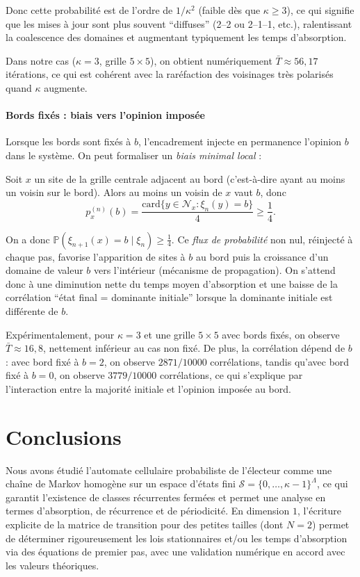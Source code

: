 \documentclass[11pt,a4paper]{article}
\begin{document}
Donc cette probabilité est de l’ordre de $1/\kappa^2$ (faible dès que $\kappa\ge 3$),
ce qui signifie que les mises à jour sont plus souvent ``diffuses'' (2--2 ou 2--1--1, etc.),
ralentissant la coalescence des domaines et augmentant typiquement les temps d’absorption.

Dans notre cas ($\kappa=3$, grille $5\times5$), on obtient numériquement
$\bar{T}\approx 56{,}17$ itérations, ce qui est cohérent avec la raréfaction des voisinages
très polarisés quand $\kappa$ augmente.

\paragraph{Bords fixés : biais vers l'opinion imposée}

Lorsque les bords sont fixés à $b$, l’encadrement injecte en permanence l’opinion $b$ dans le système.
On peut formaliser un \emph{biais minimal local} :

Soit $x$ un site de la grille centrale adjacent au bord (c’est-à-dire ayant au moins un voisin sur le bord).
Alors au moins un voisin de $x$ vaut $b$, donc
\[
p_x^{(n)}(b)=\frac{\text{card}\{y\in\mathcal{N}_x:\xi_n(y)=b\}}{4}\ge \frac{1}{4}.
\]

On a donc $\mathbb{P}(\xi_{n+1}(x)=b\mid \xi_n)\ge \frac{1}{4}$.  Ce
\emph{flux de probabilité} non nul, réinjecté à chaque pas, favorise
l’apparition de sites à $b$ au bord puis la croissance d’un domaine de
valeur $b$ vers l’intérieur (mécanisme de propagation).  On s’attend
donc à une diminution nette du temps moyen d’absorption et une baisse
de la corrélation ``état final = dominante initiale'' lorsque la dominante
initiale est différente de $b$.

Expérimentalement, pour $\kappa=3$ et une grille $5\times5$ avec bords fixés,
on observe $\bar{T}\approx 16{,}8$, nettement inférieur au cas non fixé.
De plus, la corrélation dépend de $b$ :
avec bord fixé à $b=2$, on observe $2871/10000$ corrélations,
tandis qu'avec bord fixé à $b=0$, on observe $3779/10000$ corrélations,
ce qui s’explique par l’interaction entre la majorité initiale et l’opinion imposée au bord.




\section{Conclusions}\label{conclusions}

Nous avons étudié l’automate cellulaire probabiliste de l’électeur
comme une chaîne de Markov homogène sur un espace d’états fini
$\mathcal S=\{0,\dots,\kappa-1\}^{\Lambda}$, ce qui garantit
l’existence de classes récurrentes fermées et permet une analyse en
termes d’absorption, de récurrence et de périodicité. En dimension
$1$, l’écriture explicite de la matrice de transition pour des petites
tailles (dont $N=2$) permet de déterminer rigoureusement les lois
stationnaires et/ou les temps d’absorption via des équations de
premier pas, avec une validation numérique en accord avec les valeurs
théoriques.
\end{document}
